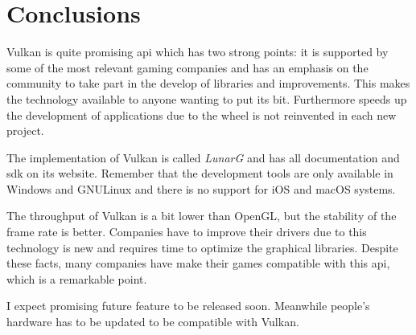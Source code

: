 \chapter{Conclusions}
Vulkan is quite promising \gls{api} which has two strong points: it is supported by some of the most relevant
gaming companies and has an emphasis on the community to take part in the develop of libraries and improvements. This
makes the technology available to anyone wanting to put its bit. Furthermore speeds up the development of applications
due to the wheel is not reinvented in each new project.

The implementation of Vulkan is called \emph{LunarG} and has all documentation and \gls{sdk} on its website. Remember
that the development tools are only available in Windows and GNU\/Linux and there is no support for iOS and macOS
systems.

The throughput of Vulkan is a bit lower than OpenGL, but the stability of the frame rate is better. Companies have to
improve their drivers due to this technology is new and requires time to optimize the graphical libraries. Despite
these facts, many companies have make their games compatible with this \gls{api}, which is a remarkable point.

I expect promising future feature to be released soon. Meanwhile people's hardware has to be updated to be compatible
with Vulkan. 
